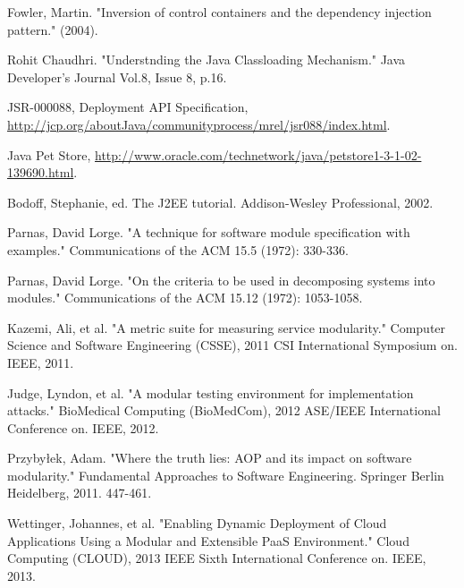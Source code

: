 \documentclass[conference]{IEEEtran}
\begin{document}
\begin{thebibliography}{9}
Fowler, Martin. "Inversion of control containers and the dependency injection pattern." (2004).


Rohit Chaudhri. "Understnding the Java Classloading Mechanism." Java Developer's Journal Vol.8, Issue 8, p.16.


JSR-000088, Deployment API Specification, \url{http://jcp.org/aboutJava/communityprocess/mrel/jsr088/index.html}.

Java Pet Store, \url{http://www.oracle.com/technetwork/java/petstore1-3-1-02-139690.html}.

Bodoff, Stephanie, ed. The J2EE tutorial. Addison-Wesley Professional, 2002.



Parnas, David Lorge. "A technique for software module specification with examples." Communications of the ACM 15.5 (1972): 330-336.

Parnas, David Lorge. "On the criteria to be used in decomposing systems into modules." Communications of the ACM 15.12 (1972): 1053-1058.

Kazemi, Ali, et al. "A metric suite for measuring service modularity." Computer Science and Software Engineering (CSSE), 2011 CSI International Symposium on. IEEE, 2011.

Judge, Lyndon, et al. "A modular testing environment for implementation attacks." BioMedical Computing (BioMedCom), 2012 ASE/IEEE International Conference on. IEEE, 2012.

Przybyłek, Adam. "Where the truth lies: AOP and its impact on software modularity." Fundamental Approaches to Software Engineering. Springer Berlin Heidelberg, 2011. 447-461.

Wettinger, Johannes, et al. "Enabling Dynamic Deployment of Cloud Applications Using a Modular and Extensible PaaS Environment." Cloud Computing (CLOUD), 2013 IEEE Sixth International Conference on. IEEE, 2013.


\end{thebibliography}
\end{document}
